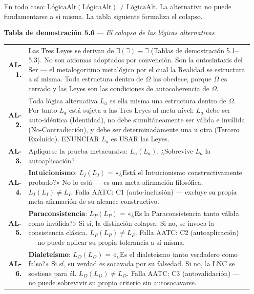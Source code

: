 \documentclass[10pt, openany, oneside]{book}
\renewcommand{\footnotesize}{\fontsize{8.5}{11}\selectfont}
\begin{document}
\vspace{0.3em}

\noindent En todo caso: $\text{LógicaAlt}(\text{LógicaAlt}) \neq \text{LógicaAlt}$. La alternativa no puede fundamentarse a sí misma. La tabla siguiente formaliza el colapso.

\vspace{0.8em}

\textbf{Tabla de demostración 5.6} --- \textit{El colapso de las lógicas alternativas}

\vspace{0.5em}

{\footnotesize
\noindent\begin{tabular}{r p{}}
\textbf{AL-1.} & Las Tres Leyes se derivan de $\exists(\exists) \equiv \exists$ (Tablas de demostración 5.1--5.3). No son axiomas adoptados por convención. Son la ontosintaxis del Ser --- el metalogoritmo metalógico por el cual la Realidad se estructura a sí misma. Toda estructura dentro de $\Omega$ las obedece, porque $\Omega$ es cerrado y las Leyes son las condiciones de autocoherencia de $\Omega$. \\[0.3em]
\textbf{AL-2.} & Toda lógica alternativa $L_a$ es ella misma una estructura dentro de $\Omega$. Por tanto $L_a$ está sujeta a las Tres Leyes al meta-nivel: $L_a$ debe ser auto-idéntica (Identidad), no debe simultáneamente ser válida e inválida (No-Contradicción), y debe ser determinadamente una u otra (Tercero Excluido). ENUNCIAR $L_a$ es USAR las Leyes. \\[0.3em]
\textbf{AL-3.} & Aplíquese la prueba metacursiva: $L_a(L_a)$. ¿Sobrevive $L_a$ la autoaplicación? \\[0.3em]
\textbf{AL-4.} & \textbf{Intuicionismo}: $L_I(L_I)$ = «¿Está el Intuicionismo constructivamente probado?» No lo está --- es una meta-afirmación filosófica. $L_I(L_I) \neq L_I$. Falla AATC: C1 (auto-inclusión) --- excluye su propia meta-afirmación de su alcance constructivo. \\[0.3em]
\textbf{AL-5.} & \textbf{Paraconsistencia}: $L_P(L_P)$ = «¿Es la Paraconsistencia tanto válida como inválida?» Si sí, la distinción colapsa. Si no, se invoca la consistencia clásica. $L_P(L_P) \neq L_P$. Falla AATC: C2 (autoaplicación) --- no puede aplicar su propia tolerancia a sí misma. \\[0.3em]
\textbf{AL-6.} & \textbf{Dialeteísmo}: $L_D(L_D)$ = «¿Es el dialeteísmo tanto verdadero como falso?» Si sí, su verdad es socavada por su falsedad. Si no, la LNC se sostiene para él. $L_D(L_D) \neq L_D$. Falla AATC: C3 (autovalidación) --- no puede sobrevivir su propio criterio sin autosocavarse. \\[0.3em]

\end{tabular}}
\end{document}
